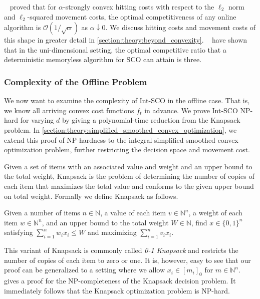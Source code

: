 \citeauthor*{Goel2019}~\cite{Goel2019} proved that for $\alpha$-strongly convex hitting costs with respect to the $\ell_2$ norm and $\ell_2$-squared movement costs, the optimal competitiveness of any online algorithm is $\mathcal{O}(1/\sqrt{\alpha})$ as $\alpha \downarrow 0$. We discuss hitting costs and movement costs of this shape in greater detail in \cref{section:theory:beyond_convexity}. \citeauthor*{Bansal2015}~\cite{Bansal2015} have shown that in the uni-dimensional setting, the optimal competitive ratio that a deterministic memoryless algorithm for SCO can attain is three.

\subsubsection{Complexity of the Offline Problem}

We now want to examine the complexity of Int-SCO in the offline case. That is, we know all arriving convex cost functions $f_t$ in advance. We prove Int-SCO NP-hard for varying $d$ by giving a polynomial-time reduction from the Knapsack problem. In \cref{section:theory:simplified_smoothed_convex_optimization}, we extend this proof of NP-hardness to the integral simplified smoothed convex optimization problem, further restricting the decision space and movement cost.

Given a set of items with an associated value and weight and an upper bound to the total weight, Knapsack is the problem of determining the number of copies of each item that maximizes the total value and conforms to the given upper bound on total weight. Formally we define Knapsack as follows.

\begin{problem}[Knapsack (KP)]
Given a number of items $n \in \mathbb{N}$, a value of each item $v \in \mathbb{N}^n$, a weight of each item $w \in \mathbb{N}^n$, and an upper bound to the total weight $W \in \mathbb{N}$, find $x \in \{0,1\}^n$ satisfying $\sum_{i = 1}^n w_i x_i \leq W$ and maximizing $\sum_{i=1}^n v_i x_i$.
\end{problem}

This variant of Knapsack is commonly called \emph{0-1 Knapsack} and restricts the number of copies of each item to zero or one. It is, however, easy to see that our proof can be generalized to a setting where we allow $x_i \in [m_i]_0$ for $m \in \mathbb{N}^n$. \citeauthor*{Williamson2014}~\cite{Williamson2014} gives a proof for the NP-completeness of the Knapsack decision problem. It immediately follows that the Knapsack optimization problem is NP-hard.

